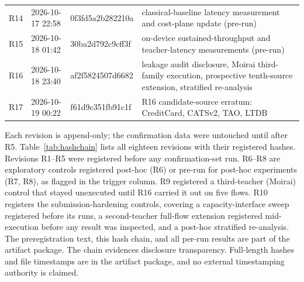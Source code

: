 \documentclass[pdflatex,sn-basic,Numbered]{sn-jnl}
\begin{document}
\begin{table}[t]
\begin{tabular}{lllp{4.2cm}}
R14 & 2026-10-17 22:58 & 0f3fd5a2b282210a & classical-baseline latency measurement and cost-plane update (pre-run) \\
R15 & 2026-10-18 01:42 & 30ba2d792c9cff3f & on-device sustained-throughput and teacher-latency measurements (pre-run) \\
R16 & 2026-10-18 23:40 & af2f5824507d6682 & leakage audit disclosure, Moirai third-family execution, prospective tenth-source extension, stratified re-analysis \\
R17 & 2026-10-19 00:22 & f61d9c351fb91c1f & R16 candidate-source erratum: CreditCard, CATSv2, TAO, LTDB \\
\bottomrule
\end{tabular}
\end{table}
Each revision is append-only; the confirmation data were untouched until
after R5. Table~\ref{tab:hashchain} lists all eighteen revisions
with their registered hashes. Revisions R1--R5 were registered before any confirmation-set
run. R6--R8 are exploratory controls registered post-hoc (R6) or
pre-run for post-hoc experiments (R7, R8), as flagged in the trigger
column.
R9 registered a third-teacher (Moirai) control that stayed unexecuted
until R16 carried it out on five flows.
R10 registers the submission-hardening controls, covering a
capacity-interface sweep registered before its runs, a second-teacher
full-flow extension registered mid-execution before any result was
inspected, and a post-hoc stratified re-analysis.
The preregistration text, this hash chain, and all per-run
results are part of the artifact package.
The chain evidences disclosure transparency.
Full-length hashes and file timestamps are in the artifact package, and
no external timestamping authority is claimed.
\end{document}
